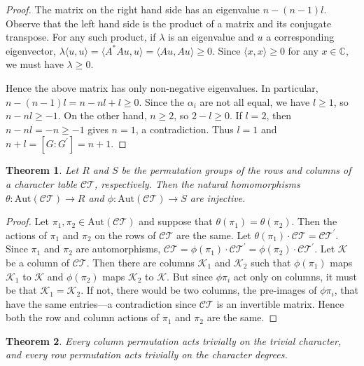 \documentclass[12pt,letterpaper]{article}
\newtheorem{thm}{Theorem}
\begin{document}
\begin{proof}
The matrix on the right hand side has an eigenvalue
$n-(n-1)l$. Observe that the left hand side is the product of a matrix
and its conjugate transpose. For any such product, if $\lambda$ is an
eigenvalue and $u$ a corresponding eigenvector,
$\lambda\langle u,u\rangle = \langle A^*Au,u\rangle = \langle
Au,Au\rangle\geq 0$.
Since $\langle x,x\rangle\geq 0$ for any $x\in\mathbb{C}$, we must
have $\lambda\geq 0$.

Hence the above matrix has only non-negative eigenvalues. In
particular, $n-(n-1)l = n-nl+l\geq 0$. Since the $\alpha_i$ are not
all equal, we have $l\geq 1$, so $n-nl\geq -1$. On the other hand,
$n\geq 2$, so $2-l\geq 0$. If $l=2$, then $n-nl=-n\geq -1$ gives
$n=1$, a contradiction. Thus $l=1$ and $n+l=[G:G^{\prime}]=n+1$.
\end{proof}

\begin{thm}
  Let $R$ and $S$ be the permutation groups of the rows and columns of
  a character table $\mathcal{CT}$, respectively. Then the natural
  homomorphisms $\theta: \mathrm{Aut}{(\mathcal{CT})}\to R$ and $\phi:
  \mathrm{Aut}{(\mathcal{CT})}\to S$ are injective.
\end{thm}

\begin{proof}
  Let $\pi_1,\pi_2\in\mathrm{Aut}{(\mathcal{CT})}$ and suppose that
  $\theta(\pi_1)=\theta(\pi_2)$. Then the actions of $\pi_1$ and
  $\pi_2$ on the rows of $\mathcal{CT}$ are the same. Let
  $\theta(\pi_1)\cdot \mathcal{CT} = \mathcal{CT}^{\prime}$. Since
  $\pi_1$ and $\pi_2$ are automorphisms,
  $\mathcal{CT}=\phi(\pi_1)\cdot\mathcal{CT}^{\prime}=\phi(\pi_2)\cdot\mathcal{CT}^{\prime}$. Let
  $\mathcal{K}$ be a column of $\mathcal{CT}$. Then there are columns
  $\mathcal{K}_1$ and $\mathcal{K}_2$ such that $\phi(\pi_1)$ maps
  $\mathcal{K}_1$ to $\mathcal{K}$ and $\phi(\pi_2)$ maps
  $\mathcal{K}_2$ to $\mathcal{K}$. But since $\phi\pi_i$ act only on
  columns, it must be that $\mathcal{K}_1=\mathcal{K}_2$. If not,
  there would be two columns, the pre-images of $\phi\pi_i$, that have
  the same entries---a contradiction since $\mathcal{CT}$ is an
  invertible matrix. Hence both the row and column actions of $\pi_1$
  and $\pi_2$ are the same.
\end{proof}


\begin{thm}
  Every column permutation acts trivially on the trivial character,
  and every row permutation acts trivially on the character degrees.
\end{thm}
\end{document}
